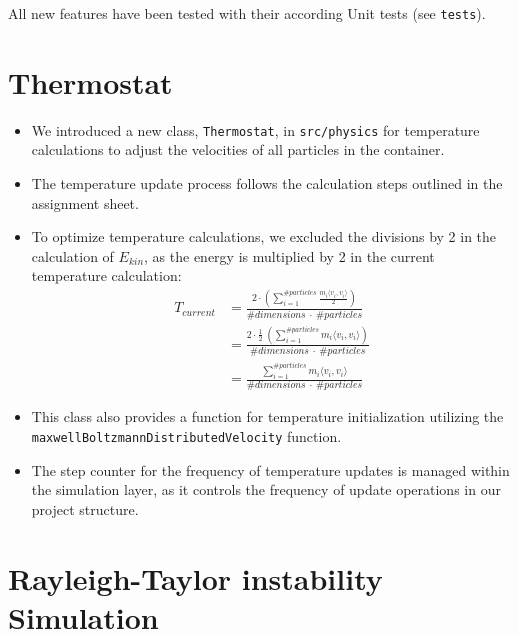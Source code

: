 \documentclass{article}
\begin{document}
All new features have been tested with their according Unit tests (see \texttt{tests}).

\section{Thermostat}
\label{sec:thermo}

    \begin{itemize}
        \item We introduced a new class, \texttt{Thermostat}, in \texttt{src/physics} for temperature calculations to adjust the velocities of all particles in the container.
        \item The temperature update process follows the calculation steps outlined in the assignment sheet.
        \item To optimize temperature calculations, we excluded the divisions by 2 in the calculation of $E_{kin}$, as the energy is multiplied by 2 in the current temperature calculation:
        \begin{align}
            T_{current} &= \frac{2 \cdot \left(\sum_{i=1}^{\#particles} \frac{m_i \langle v_i, v_i \rangle}{2}\right)}{\#dimensions\ \cdot\ \#particles} \\
            &= \frac{2 \cdot \frac{1}{2}\ \left(\sum_{i=1}^{\#particles} m_i \langle v_i, v_i \rangle\right)}{\#dimensions\ \cdot\ \#particles} \\
            &= \frac{\sum_{i=1}^{\#particles} m_i \langle v_i, v_i \rangle}{\#dimensions\ \cdot\ \#particles}
        \end{align}
        \item This class also provides a function for temperature initialization utilizing the \texttt{maxwellBoltzmannDistributedVelocity} function.
        \item The step counter for the frequency of temperature updates is managed within the simulation layer, as it controls the frequency of update operations in our project structure.
    \end{itemize}
    
    
\section{Rayleigh-Taylor instability Simulation}
\label{sec:rayleigh}
\end{document}
